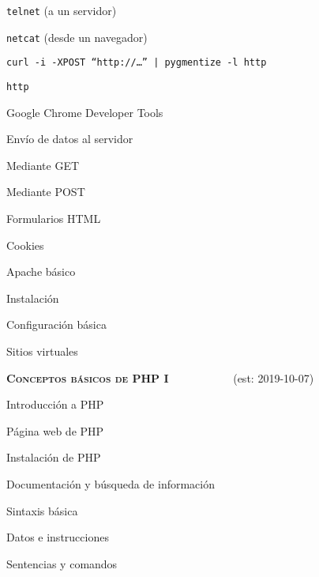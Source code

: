 \begin{longenum}
\begin{longenum}
\begin{longenum}
\begin{longenum}
                \item \texttt{telnet} (a un servidor)
                \item \texttt{netcat} (desde un navegador)
                \item \texttt{curl -i -XPOST “http://…” | pygmentize -l http}
                \item \texttt{http}
                \item Google Chrome Developer Tools
            \end{longenum}
            \item Envío de datos al servidor
            \begin{longenum}
                \item Mediante GET
                \item Mediante POST
                \item Formularios HTML
            \end{longenum}
            \item Cookies
        \end{longenum}
        \item Apache básico \opcional\
        \begin{longenum}
            \item Instalación
            \item Configuración básica
            \item Sitios virtuales
        \end{longenum}
    \end{longenum}
    \item \textbf{\textsc{Conceptos básicos de PHP I}} \ \ \ \ \ \ \ \ \ \ \ (est: \mbox{2019-10-07})
    \begin{longenum}
        \item Introducción a PHP
        \begin{longenum}
            \item Página web de PHP
            \item Instalación de PHP
            \item Documentación y búsqueda de información
        \end{longenum}
        \item Sintaxis básica
        \begin{longenum}
            \item Datos e instrucciones
            \item Sentencias y comandos

\end{longenum}
\end{longenum}
\end{longenum}
